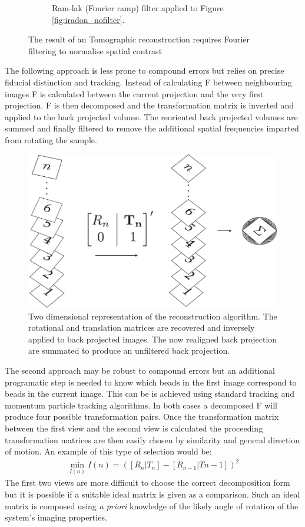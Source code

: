\begin{figure}
\begin{subfigure}[t]{0.3\textwidth}
    \caption{Ram-lak (Fourier ramp) filter applied to Figure \ref{fig:iradon_nofilter}.}
    \label{fig:iradon_filter}
  \end{subfigure}
    \hfill
    \label{fig:irandons}
  \caption{The result of an Tomographic reconstruction requires Fourier filtering to normalise spatial contrast}
\end{figure}

The following approach is less prone to compound errors but relies on precise fiducial distinction and tracking.
Instead of calculating F between neighbouring images F is calculated between the current projection and the very first projection.
F is then decomposed and the transformation matrix is inverted and applied to the back projected volume.
The reoriented back projected volumes are summed and finally filtered to remove the additional spatial frequencies imparted from rotating the sample.

\begin{figure}
  \centering
  \includegraphics{Chapters/flopt/Figs/PDF/flopt_algorithm}
  \caption{Two dimensional representation of the reconstruction algorithm.
  The rotational and translation matrices are recovered and inversely applied to back projected images.
  The now realigned back projection are summated to produce an unfiltered back projection.}
\end{figure}

The second approach may be robust to compound errors but an additional programatic step is needed to know which beads in the first image correspond to beads in the current image.
This can be is achieved using standard tracking and momentum particle tracking algorithms.
In both cases a decomposed F will produce four possible transformation pairs. %
Once the transformation matrix between the first view and the second view is calculated the proceeding transformation matrices are then easily chosen by similarity and general direction of motion.
An example of this type of selection would be:
\begin{align}
\min_{I(n)}I(n) = ([R_n|T_n]  - [R_{n-1}|T{n-1}])^2
\end{align}
The first two views are more difficult to choose the correct decomposition form but it is possible if a suitable ideal matrix is given as a comparison.
Such an ideal matrix is composed using \emph{a priori} knowledge of the likely angle of rotation of the system's imaging properties.

